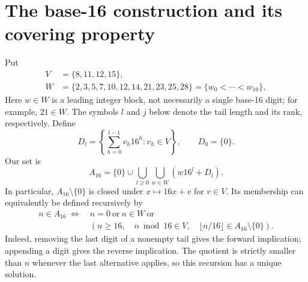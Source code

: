 \documentclass[11pt]{article}
\theoremstyle{definition}\newtheorem{definition}[theorem]{Definition}
\theoremstyle{remark}\newtheorem{remark}[theorem]{Remark}
\numberwithin{equation}{section}
\begin{document}
\section{The base-16 construction and its covering property}\label{sec:digits}
Put
\begin{equation}\label{eq:WV}
\begin{split}
V&=\{8,11,12,15\},\\
W&=\{2,3,5,7,10,12,14,21,23,25,28\}=\{w_0<\cdots<w_{10}\},
\end{split}
\end{equation}
Here $w\in W$ is a leading integer block, not necessarily a single base-16
digit; for example, $21\in W$. The symbols $l$ and $j$ below denote the tail
length and its rank, respectively. Define
\[
D_l=\left\{\sum_{h=0}^{l-1}v_h16^h:v_h\in V\right\},\qquad D_0=\{0\}.
\]
Our set is
\begin{equation}\label{eq:set16}
A_{16}=\{0\}\cup\bigcup_{l\ge0}\bigcup_{w\in W}(w16^l+D_l).
\end{equation}
In particular, $A_{16}\setminus\{0\}$ is closed under $x\mapsto16x+v$ for $v\in V$. Its membership can equivalently be defined recursively by
\begin{equation}\label{eq:recursion}
\begin{split}
n\in A_{16}\ \Longleftrightarrow\ &n=0\ \text{or}\ n\in W\ \text{or}\\
&\left(n\ge16,\quad n\bmod16\in V,\quad
\lfloor n/16\rfloor\in A_{16}\setminus\{0\}\right).
\end{split}
\end{equation}
Indeed, removing the last digit of a nonempty tail gives the forward implication; appending a digit gives the reverse implication. The quotient is strictly smaller than $n$ whenever the last alternative applies, so this recursion has a unique solution.
\end{document}
